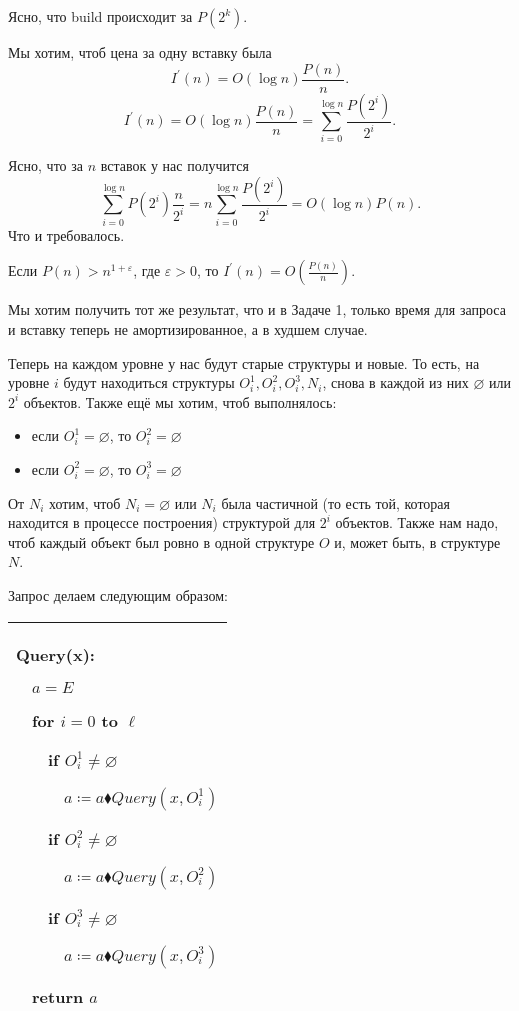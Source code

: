 Ясно, что build происходит за $P\left(2^k\right)$.


Мы хотим, чтоб цена за одну вставку была
$$I^\prime(n)=O(\log n )\frac{P(n)}{n}.$$
$$I^\prime(n)=O(\log n )\frac{P(n)}{n}=\sum_{i=0}^{\log n}\frac{P(2^i)}{2^i}.$$

Ясно, что за $n$ вставок у нас получится
$$\sum_{i=0}^{\log n}P\left(2^i\right)\frac{n}{2^i} =n \sum_{i=0}^{\log n}\frac{P(2^i)}{2^i} = O(\log n)P(n).$$
Что и требовалось.

\begin{remark}
Если $P(n)>n^{1+\varepsilon}$, где $\varepsilon>0$, то $I^\prime(n)=O\left(\frac{P(n)}{n}\right)$.
\end{remark}

\begin{task}
Мы хотим получить тот же результат, что и в Задаче 1, только время для запроса и вставку теперь не амортизированное, а в худшем случае.
\end{task}
Теперь на каждом уровне у нас будут старые структуры и новые. То есть, на уровне $i$ будут находиться структуры $O_i^1,O_i^2,O_i^3,N_i$, снова в каждой из них $\varnothing$ или $2^i$ объектов. Также ещё мы хотим, чтоб выполнялось:
\begin{itemize}
    \item если $O_i^1=\varnothing$, то $O_i^2 = \varnothing$
    \item если $O_i^2=\varnothing$, то $O_i^3 = \varnothing$
\end{itemize}

От $N_i$ хотим, чтоб $N_i=\varnothing$ или $N_i$ была частичной (то есть той, которая находится в процессе построения) структурой для $2^i$ объектов. Также нам надо, чтоб каждый объект был ровно в одной структуре $O$ и, может быть, в структуре $N$.

Запрос делаем следующим образом:


\begin{tabular}{|p{5cm}|}
\hline
Query(x):

$\quad$$a=E$

$\quad$for $i=0$ to $\ell$

$\quad$$\quad$if $O^1_i \ne \varnothing$

$\quad$$\quad$$\quad$$a \coloneqq a \blacklozenge Query(x,O^1_i)$

$\quad$$\quad$if $O^2_i \ne \varnothing$

$\quad$$\quad$$\quad$$a \coloneqq a \blacklozenge Query(x,O^2_i)$

$\quad$$\quad$if $O^3_i \ne \varnothing$

$\quad$$\quad$$\quad$$a \coloneqq a \blacklozenge Query(x,O^3_i)$

$\quad$return $a$\\

\hline
\end{tabular}


